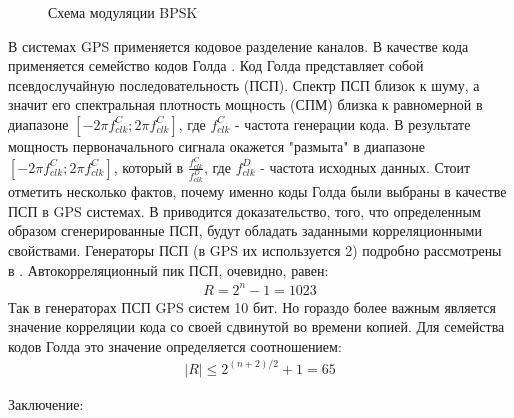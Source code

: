 \documentclass[a4paper,12pt]{article}
\numberwithin{table}{section}
\begin{document}
\begin{figure}[h]
\begin{center}
\end{center}
\caption{Схема модуляции BPSK}
\label{pic:bpsk}
\end{figure}

В системах GPS применяется кодовое разделение каналов. В качестве кода применяется семейство кодов Голда \cite{gold-ieee}.
Код Голда представляет собой псевдослучайную последовательность (ПСП). Спектр ПСП близок к шуму, а значит его
спектральная плотность мощность (СПМ) близка к равномерной в диапазоне ${[-2\pi{f_{clk}^{C}};2\pi{f_{clk}^{C}}]}$, где
${f_{clk}^{C}}$ - частота генерации кода. В результате мощность первоначального сигнала окажется "размыта" в диапазоне 
${[-2\pi{f_{clk}^{C}};2\pi{f_{clk}^{C}}]}$, который в ${\frac{f_{clk}^{C}}{f_{clk}^{D}}}$, где ${f_{clk}^{D}}$ - частота
исходных данных. Стоит отметить несколько фактов, почему именно коды Голда были выбраны в качестве ПСП в GPS системах. 
В \cite{gold-ieee} приводится доказательство, того, что определенным образом сгенерированные ПСП, будут обладать заданными
корреляционными свойствами. Генераторы ПСП (в GPS их используется 2) подробно рассмотрены в \cite{tsui, akos-book}. 
Автокорреляционный пик ПСП, очевидно, равен:
\begin{eqnarray}
	R = 2^n -1 = 1023 
\label{eq:ca_peak}
\end{eqnarray}
Так в генераторах ПСП GPS систем 10 бит. Но гораздо более важным является значение корреляции кода со своей сдвинутой во
времени копией. Для семейства кодов Голда это значение определяется соотношением:
\begin{eqnarray}
	\left|{R}\right| \leq 2^{(n+2)/2} + 1 = 65
\label{eq:ca_peak}
\end{eqnarray}

Заключение:


\end{document}
